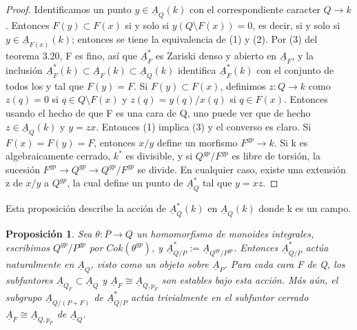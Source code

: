 \documentclass[12pt,spanish]{amsart}
\newtheorem{prop}[Theorem]{Proposición}
\theoremstyle{definition}
\theoremstyle{remark}
\begin{document}
\begin{proof}
Identificamos un punto $y\in \underline{A}_{Q}(k)$ con el correspondiente caracter $Q \to k$. Entonces $F(y) \subset F(x)$ si y solo si $y(Q\setminus F(x))=0$, es decir, si y solo si $y\in \underline{A}_{F(x)}(k)$; entonces se tiene la equivalencia de (1) y (2). Por (3) del teorema 3.20, F es fino, así que $\underline{A}_{F}^{\ast}$ es Zariski denso y abierto en $\underline{A}_{F}$, y la inclusión $\underline{A}_{F}^{\ast}(k) \subset \underline{A}_{F}(k) \subset \underline{A}_{Q}(k)$ identifica $\underline{A}_{F}^{\ast}(k)$ con el conjunto de todos los y tal que $F(y)=F$.  Si $F(y) \subset F(x)$, definimos $z: Q \to k$ como $z(q)=0$ si $q\in Q\setminus F(x)$ y $z(q)=y(q)/x(q)$ si $q\in F(x)$. Entonces usando el hecho de que F es una cara de Q, uno puede ver que de hecho $z\in \underline{A}_{Q}(k)$ y $y=zx$. Entonces (1) implica (3) y el converso es claro. Si $F(x)=F(y)=F$, entonces $x/y$ define un morfismo $F^{gp} \to k$. Si k es algebraicamente cerrado, $k^{\ast}$ es divisible, y si $Q^{gp}/F^{gp}$ es libre de torsión, la sucesión $F^{gp} \to Q^{gp} \to Q^{gp}/F^{gp}$ se divide. En cualquier caso, existe una extensión z de $x/y$ a $Q^{gp}$, la cual define un punto de $\underline{A}_{Q}^{\ast}$ tal que $y=xz$.   
\end{proof}

Esta proposición describe la acción de $\underline{A}_{Q}^{\ast}(k)$ en $\underline{A}_{Q}(k)$ donde k es un campo.  

\begin{prop}
Sea $\theta: P \to Q$ un homomorfismo de monoides \textit{integral}es, escribimos $Q^{gp}/P^{gp}$ por $Cok(\theta^{gp})$, y $\underline{A}_{Q/P}^{\ast}:= \underline{A}_{Q^{gp}/P^{gp}}$. Entonces $\underline{A}_{Q/P}^{\ast}$ actúa naturalmente en $\underline{A}_{Q}$, visto como un objeto sobre $\underline{A}_{P}$. Para cada cara F de Q, los subfuntores $\underline{A}_{Q_{F}} \subset \underline{A}_{Q}$ y $\underline{A}_{F}\cong \underline{A}_{Q,p_{F}}$ son estables bajo esta acción. Más aún, el subgrupo $\underline{A}_{Q/(P+F)}$ de $\underline{A}_{Q/P}^{\ast}$ actúa trivialmente en el subfuntor cerrado $\underline{A}_{F} \cong \underline{A}_{Q,p_{F}}$ de $\underline{A}_{Q}$. 
\end{prop}
\end{document}
